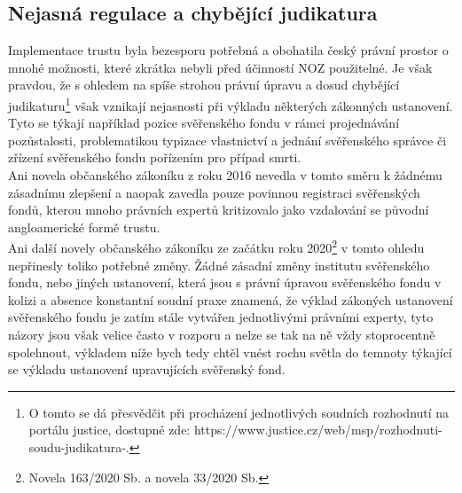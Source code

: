 \documentclass{article}
\begin{document}

\newpage


\subsection{Nejasná regulace a chybějící judikatura}

Implementace trustu byla bezesporu potřebná a obohatila český právní prostor o mnohé možnosti, které zkrátka nebyli před účinností NOZ použitelné. Je však pravdou, že s ohledem na spíše strohou právní úpravu a dosud chybějící judikaturu\footnote{O tomto se dá přesvědčit při procházení jednotlivých soudních rozhodnutí na portálu justice, dostupné zde: https://www.justice.cz/web/msp/rozhodnuti-soudu-judikatura-.} však vznikají nejasnosti při výkladu některých zákonných ustanovení.\\

Tyto se týkají například pozice svěřenského fondu v rámci projednávání pozůstalosti, problematikou typizace vlastnictví a jednání svěřenského správce či zřízení svěřenského fondu pořízením pro případ smrti.\\

Ani novela občanského zákoníku z roku 2016 nevedla v tomto směru k žádnému zásadnímu zlepšení a naopak zavedla pouze povinnou registraci svěřenských fondů, kterou mnoho právních expertů kritizovalo jako vzdalování se původní angloamerické formě trustu.\\

Ani další novely občanského zákoníku ze začátku roku 2020\footnote{Novela 163/2020 Sb. a novela 33/2020 Sb.} v tomto ohledu nepřinesly toliko potřebné změny. Žádné zásadní změny institutu svěřenského fondu, nebo jiných ustanovení, která jsou s právní úpravou svěřenského fondu v kolizi a absence konstantní soudní praxe znamená, že výklad zákoných ustanovení svěřenského fondu je zatím stále vytvářen jednotlivými právními experty, tyto názory jsou však velice často v rozporu a nelze se tak na ně vždy stoprocentně spolehnout, výkladem níže bych tedy chtěl vnést rochu světla do temnoty týkající se výkladu ustanovení upravujících svěřenský fond.

\end{document}
